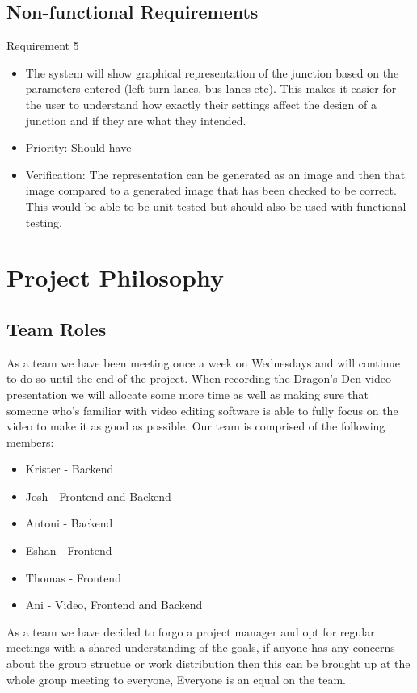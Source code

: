 \documentclass{article}
\begin{document}
\subsection{Non-functional Requirements}
Requirement 5
\begin{itemize}
  \item The system will show graphical representation of the junction based on the parameters entered (left turn lanes, bus lanes etc). This makes it easier for the user to understand how exactly their settings affect the design of a junction and if they are what they intended.
  \item Priority: Should-have 
  \item Verification: The representation can be generated as an image and then that image compared to a generated image that has been checked to be correct. This would be able to be unit tested but should also be used  with functional testing.
\end{itemize}

\section{Project Philosophy}
\subsection{Team Roles}

As a team we have been meeting once a week on Wednesdays and will continue to do 
so until the end of the project. When recording the Dragon's Den video presentation 
we will allocate some more time as well as making sure that someone who's familiar 
with video editing software is able to fully focus on the video to make it as good
as possible. Our team is comprised of the following members:

\begin{itemize}
  \item Krister - Backend 
  \item Josh - Frontend and Backend 
  \item Antoni - Backend 
  \item Eshan -  Frontend
  \item Thomas - Frontend
  \item Ani - Video, Frontend and Backend
\end{itemize}

As a team we have decided to forgo a project manager and opt for regular meetings 
with a shared understanding of the goals, if anyone has any concerns about the group 
structue or work distribution then this can be brought up at the whole group meeting 
to everyone, Everyone is an equal on the team.
\end{document}
